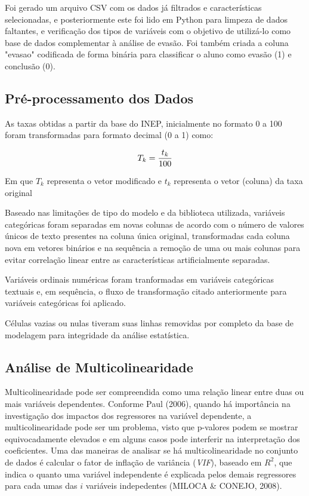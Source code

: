 \documentclass[english, spanish, brazilian]{RBIEarticle} %
\begin{document}
Foi gerado um arquivo CSV com os dados já filtrados e características selecionadas, e posteriormente este foi lido em Python para limpeza de dados faltantes, e verificação dos tipos de variáveis com o objetivo de utilizá-lo como base de dados complementar à análise de evasão. Foi também criada a coluna "evasao" codificada de forma binária para classificar o aluno como evasão (1) e conclusão (0).


\subsection{Pré-processamento dos Dados}
As taxas obtidas a partir da base do INEP, inicialmente no formato 0 a 100 foram transformadas para formato decimal (0 a 1) como:

\vspace{0.5cm}
\begin{equation}
\large T_k = \frac{t_k}{100}
\end{equation}
\vspace{0.5cm}

Em que $T_k$ representa o vetor modificado e $t_k$ representa o vetor (coluna) da taxa original

Baseado nas limitações de tipo do modelo e da biblioteca utilizada, variáveis categóricas foram separadas em novas colunas de acordo com o número de valores únicos de texto presentes na coluna única original, transformadas cada coluna nova em vetores binários e na sequência a remoção de uma ou mais colunas para evitar correlação linear entre as características artificialmente separadas.  

Variáveis ordinais numéricas foram tranformadas em variáveis categóricas textuais e, em sequência, o fluxo de transformação citado anteriormente para variáveis categóricas foi aplicado.

Células vazias ou nulas tiveram suas linhas removidas por completo da base de modelagem para integridade da análise estatística.

\subsection{Análise de Multicolinearidade}
Multicolinearidade pode ser compreendida como uma relação linear entre duas ou mais variáveis dependentes. Conforme Paul (2006), quando há importância na investigação dos impactos dos regressores na variável dependente, a multicolinearidade pode ser um problema, visto que p-valores podem se mostrar equivocadamente elevados e em alguns casos pode interferir na interpretação dos coeficientes. Uma das maneiras de analisar se há multicolinearidade no conjunto de dados é calcular o fator de inflação de variância (\textit{VIF}), baseado em $R^2$, que indica o quanto uma variável independente é explicada pelos demais regressores para cada umas das $i$ variáveis indepedentes (MILOCA \& CONEJO, 2008).
\end{document}
